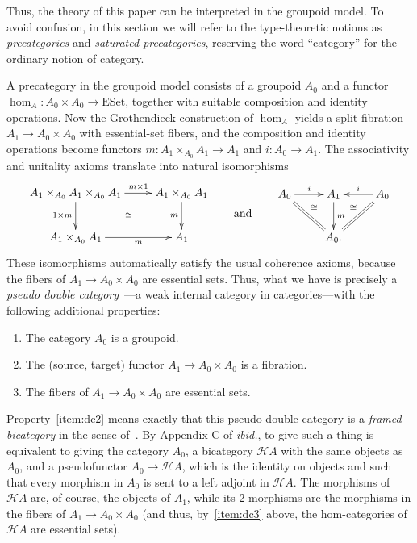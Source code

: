 Thus, the theory of this paper can be interpreted in the groupoid model.
To avoid confusion, in this section we will refer to the type-theoretic notions as \emph{precategories} and \emph{saturated precategories}, reserving the word ``category'' for the ordinary notion of category.

A precategory in the groupoid model consists of a groupoid $A_0$ and a functor $\hom_A:A_0 \times A_0 \to \mathrm{ESet}$, together with suitable composition and identity operations.
Now the Grothendieck construction of $\hom_A$ yields a split fibration $A_1 \to A_0\times A_0$ with essential-set fibers, and the composition and identity operations become functors $m:A_1 \times_{A_0} A_1 \to A_1$ and $i:A_0 \to A_1$.
The associativity and unitality axioms translate into natural isomorphisms
\begin{equation*}
  \vcenter{\xymatrix{
      A_1 \times_{A_0}  A_1 \times_{A_0} A_1 \ar[r]^-{m\times 1}\ar[d]_{1\times m}
      \ar@{}[dr]|\cong &
      A_1 \times_{A_0}  A_1\ar[d]_m\\
      A_1 \times_{A_0}  A_1\ar[r]_-m &
      A_1
    }}
  \qquad\text{and}\qquad
  \vcenter{\xymatrix{
      A_0 \ar[r]^-{i} \ar@{=}[dr] \ar@{}[drr]|(.3){\cong} &
      A_1 \ar[d]^m &
      A_0 \ar[l]_-{i} \ar@{=}[dl] \ar@{}[dll]|(.3){\cong}\\
      & A_0. &
    }}
\end{equation*}
These isomorphisms automatically satisfy the usual coherence axioms, because the fibers of $A_1 \to A_0\times A_0$ are essential sets.
Thus, what we have is precisely a \emph{pseudo double category}~\cite{gp:double-limits}---a weak internal category in categories---with the following additional properties:
\begin{enumerate}
\item The category $A_0$ is a groupoid.\label{item:dc1}
\item The (source, target) functor $A_1 \to A_0\times A_0$ is a fibration.\label{item:dc2}
\item The fibers of $A_1 \to A_0\times A_0$ are essential sets.\label{item:dc3}
\end{enumerate}

Property~\ref{item:dc2} means exactly that this pseudo double category is a \emph{framed bicategory} in the sense of~\cite{shulman:frbi}.
By Appendix C of \textit{ibid.}, to give such a thing is equivalent to giving the category $A_0$, a bicategory $\mathcal{H}A$ with the same objects as $A_0$, and a pseudofunctor $A_0 \to \mathcal{H}A$, which is the identity on objects and such that every morphism in $A_0$ is sent to a left adjoint in $\mathcal{H}A$.
The morphisms of $\mathcal{H}A$ are, of course, the objects of $A_1$, while its 2-morphisms are the morphisms in the fibers of $A_1 \to A_0\times A_0$ (and thus, by~\ref{item:dc3} above, the hom-categories of $\mathcal{H}A$ are essential sets).

